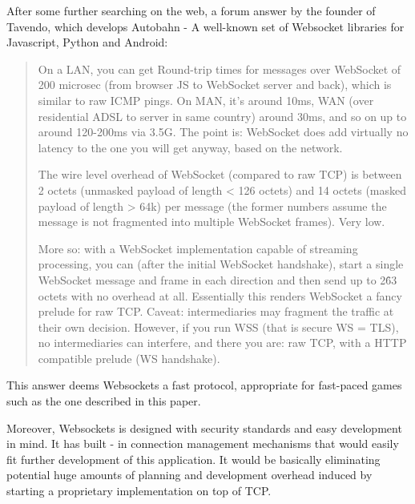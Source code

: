 After some further searching on the web, a forum answer\cite{websockets3} by the
founder of Tavendo, which develops Autobahn - A well-known set of Websocket libraries for
Javascript, Python and Android:\newline

\begin{quotation}
On a LAN, you can get Round-trip times for messages over WebSocket of 200
microsec (from browser JS to WebSocket server and back), which is similar to raw
ICMP pings. On MAN, it's around 10ms, WAN (over residential ADSL to server in
same country) around 30ms, and so on up to around 120-200ms via 3.5G. The point
is: WebSocket does add virtually no latency to the one you will get anyway,
based on the network.\newline

The wire level overhead of WebSocket (compared to raw TCP) is between 2 octets
(unmasked payload of length < 126 octets) and 14 octets (masked payload of
length > 64k) per message (the former numbers assume the message is not
fragmented into multiple WebSocket frames). Very low.\newline

More so: with a WebSocket implementation capable of streaming processing, you
can (after the initial WebSocket handshake), start a single WebSocket message
and frame in each direction and then send up to 2\^63 octets with no overhead at
all. Essentially this renders WebSocket a fancy prelude for raw TCP. Caveat:
intermediaries may fragment the traffic at their own decision. However, if you
run WSS (that is secure WS = TLS), no intermediaries can interfere, and there
you are: raw TCP, with a HTTP compatible prelude (WS handshake).
\end{quotation}

This answer deems Websockets a fast protocol, appropriate for fast-paced games
such as the one described in this paper.\newline

Moreover, Websockets is designed with security standards and easy development in
mind. It has built - in connection management mechanisms that would easily fit
further development of this application. It would be basically eliminating
potential huge amounts of planning and development overhead induced by starting
a proprietary implementation on top of TCP. \newline
